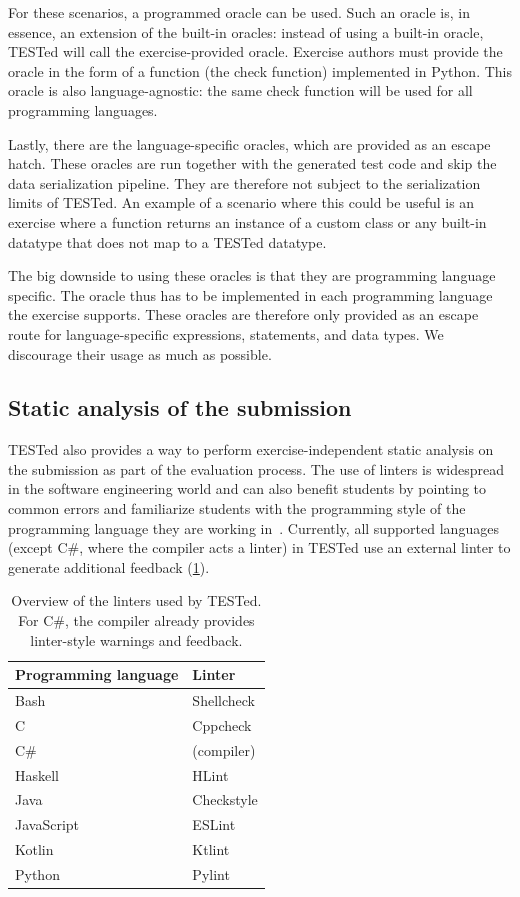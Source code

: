 \documentclass[../main]{subfiles}
\begin{document}
For these scenarios, a programmed oracle can be used.
Such an oracle is, in essence, an extension of the built-in oracles: instead of using a built-in oracle, TESTed will call the exercise-provided oracle.
Exercise authors must provide the oracle in the form of a function (the check function) implemented in Python.
This oracle is also language-agnostic: the same check function will be used for all programming languages.

Lastly, there are the language-specific oracles, which are provided as an escape hatch.
These oracles are run together with the generated test code and skip the data serialization pipeline.
They are therefore not subject to the serialization limits of TESTed.
An example of a scenario where this could be useful is an exercise where a function returns an instance of a custom class or any built-in datatype that does not map to a TESTed datatype.

The big downside to using these oracles is that they are programming language specific.
The oracle thus has to be implemented in each programming language the exercise supports.
These oracles are therefore only provided as an escape route for language-specific expressions, statements, and data types.
We discourage their usage as much as possible.

\subsection{Static analysis of the submission}\label{subsec:static-analysis-of-the-submission}

TESTed also provides a way to perform exercise-independent static analysis on the submission as part of the evaluation process.
The use of linters is widespread in the software engineering world and can also benefit students by pointing to common errors and familiarize students with the programming style of the programming language they are working in~\autocite{alomarUseStaticAnalysis2023}.
Currently, all supported languages (except C\#, where the compiler acts a linter) in TESTed use an external linter to generate additional feedback (\cref{tab:linters}).

\begin{table}[h]
    \centering
    \caption{
        Overview of the linters used by TESTed.
        For C\#, the compiler already provides linter-style warnings and feedback.
    }
    \label{tab:linters}
    \begin{tabular}{|l|l|}
        \hline
        Programming language & Linter \\
        \hline
        Bash & Shellcheck  \\
        C & Cppcheck \\
        C\# & (compiler) \\
        Haskell & HLint \\
        Java & Checkstyle \\
        JavaScript & ESLint \\
        Kotlin & Ktlint \\
        Python & Pylint \\
        \hline
    \end{tabular}
\end{table}
\end{document}
